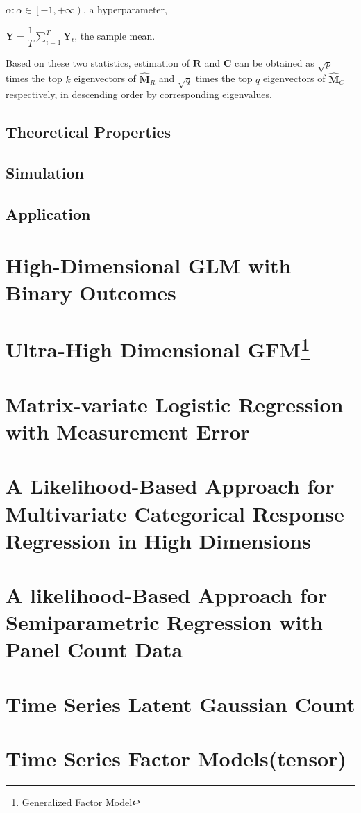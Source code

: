 \documentclass{article}[12pt]
\begin{document}
$\alpha: \alpha \in \left[-1,+\infty \right)$, a hyperparameter,

$\mathbf{\overline{Y}}=\dfrac{1}{T} \sum\limits_{i=1}^T\mathbf{Y}_t$, the sample mean.

Based on these two statistics, estimation of $\mathbf{R}$ and $\mathbf{C}$ can be obtained as $\sqrt{p}$ times the top $k$ eigenvectors of $\widehat{\mathbf{M}}_R$ and $\sqrt{q}$ times the top $q$ eigenvectors of $\widehat{\mathbf{M}}_C$ respectively, in descending order by corresponding eigenvalues.

\subsection{Theoretical Properties}

 

\subsection{Simulation}
\subsection{Application}
\section{High-Dimensional GLM with Binary Outcomes}
\section [Ultra-High Dimensional GFM]{Ultra-High Dimensional GFM\footnote{Generalized Factor Model}}  

\section{Matrix-variate Logistic Regression with Measurement Error}
\section{A Likelihood-Based Approach for Multivariate Categorical Response Regression in High Dimensions}
\section{A likelihood-Based Approach for Semiparametric Regression with Panel Count Data}


\section{Time Series Latent Gaussian Count}
\section{Time Series Factor Models(tensor)}   
\end{document}
